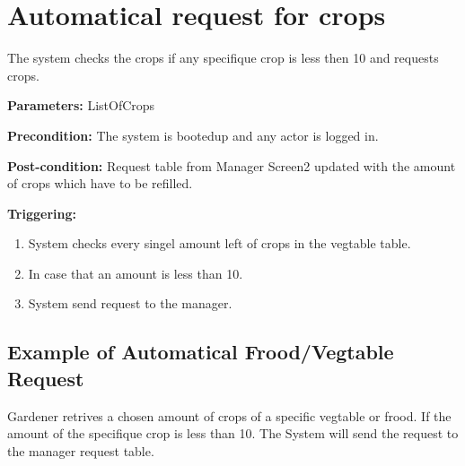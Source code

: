 \section{Automatical request for crops}
\label{operation:RequestForCrops}
The system checks the crops if any specifique crop is less then 10 and requests
crops.

\begin{description}

\item \textbf{Parameters:} ListOfCrops
\item \textbf{Precondition:} The system is bootedup and any actor is logged in.
\item \textbf{Post-condition:} Request table from Manager Screen2 updated with
the amount of crops which have to be refilled.

\item \textbf{Triggering:}
\begin{enumerate}
\item System checks every singel amount left of crops in the vegtable table.
\item In case that an amount is less than 10.
\item System send request to the manager.
\end{enumerate}
\end{description}

\subsection{Example of Automatical Frood/Vegtable Request}
Gardener retrives a chosen amount of crops of a specific vegtable or frood.
If the amount of the specifique crop is less than 10.
The System will send the request to the manager request table.


